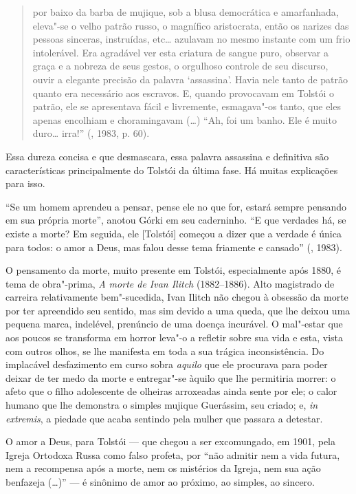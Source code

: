 \begin{quotation}
por baixo da barba de mujique, sob a blusa democrática e amarfanhada, eleva"-se o velho patrão russo, o magnífico aristocrata, então os narizes das pessoas sinceras, instruídas, etc\ldots{} azulavam no mesmo instante com um frio intolerável. Era agradável ver esta criatura de sangue puro, observar a graça e a nobreza de seus gestos, o orgulhoso controle de seu discurso, ouvir a
elegante precisão da palavra `assassina'. Havia nele tanto de patrão quanto era necessário aos escravos. E, quando provocavam em Tolstói o patrão, ele se apresentava fácil e livremente, esmagava"-os tanto, que eles apenas encolhiam e choramingavam (\ldots{}) ``Ah, foi um banho. Ele é muito duro\ldots{} irra!'' (, 1983, p. 60).
\end{quotation}

Essa dureza concisa e que desmascara, essa palavra
assassina e definitiva são características principalmente do Tolstói
da última fase. Há muitas explicações para isso.

``Se um homem aprendeu a pensar, pense ele no que
for, estará sempre pensando em sua própria morte'', anotou Górki em
seu caderninho. ``E que verdades há, se existe a morte? Em seguida,
ele [Tolstói] começou a dizer que a verdade é única para todos: o
amor a Deus, mas falou desse tema friamente e cansado'' (, 1983).

O pensamento da morte, muito presente em Tolstói, especialmente após 1880, é tema de obra"-prima, \emph{A morte de Ivan Ilitch} (1882--1886). Alto magistrado de carreira relativamente bem"-sucedida, Ivan Ilitch não chegou à obsessão da morte por ter apreendido seu sentido, mas sim devido a uma queda, que lhe deixou uma pequena marca, indelével, prenúncio de uma doença incurável. O mal"-estar que aos poucos se transforma em horror leva"-o a refletir sobre sua vida e esta, vista com outros olhos, se
lhe manifesta em toda a sua trágica inconsistência. Do implacável desfazimento em curso sobra \emph{aquilo} que ele procurava
para poder deixar de ter medo da morte e entregar"-se àquilo que lhe permitiria morrer: o afeto que o filho adolescente de olheiras
arroxeadas ainda sente por ele; o calor humano que lhe demonstra o simples mujique Guerássim, seu criado; e, \emph{in extremis}, a
piedade que acaba sentindo pela mulher que passara a detestar.

O amor a Deus, para Tolstói --- que chegou a ser excomungado, em 1901, pela
Igreja Ortodoxa Russa como falso profeta,
por ``não admitir nem a vida futura, nem a recompensa após a
morte, nem os mistérios da Igreja, nem sua ação benfazeja (\ldots{})'' --- é
sinônimo de amor ao próximo, ao simples, ao sincero.

